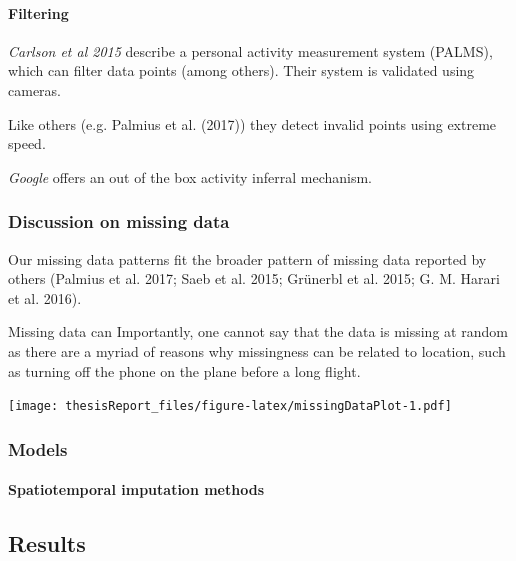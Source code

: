 \documentclass[]{article}
\let\oldparagraph\paragraph
\renewcommand{\paragraph}[1]{\oldparagraph{#1}\mbox{}}
\let\origfigure\figure
\let\endorigfigure\endfigure
\renewenvironment{figure}[1][2] {
    \expandafter\origfigure\expandafter[H]
} {
    \endorigfigure
}
\begin{document}
\paragraph{Filtering}\label{filtering}

\emph{Carlson et al 2015} describe a personal activity measurement
system (PALMS), which can filter data points (among others). Their
system is validated using cameras.

Like others (e.g. Palmius et al. (2017)) they detect invalid points
using extreme speed.

\emph{Google} offers an out of the box activity inferral mechanism.

\subsubsection{Discussion on missing
data}\label{discussion-on-missing-data}

Our missing data patterns fit the broader pattern of missing data
reported by others (Palmius et al. 2017; Saeb et al. 2015; Grünerbl et
al. 2015; G. M. Harari et al. 2016).

Missing data can Importantly, one cannot say that the data is missing at
random as there are a myriad of reasons why missingness can be related
to location, such as turning off the phone on the plane before a long
flight.

\begin{figure}
\centering
\texttt{[image: thesisReport\_files/figure-latex/missingDataPlot-1.pdf]}
\caption{Missing data over time for the author. The x-axis denotes time,
the y-axis shows how many measurements are made on each day. The fill of
the points shows the amount of hours of captured data each day.}
\end{figure}

\subsubsection{Models}\label{models}

\paragraph{Spatiotemporal imputation
methods}\label{spatiotemporal-imputation-methods-1}

\subsection{Results}\label{results}
\end{document}
